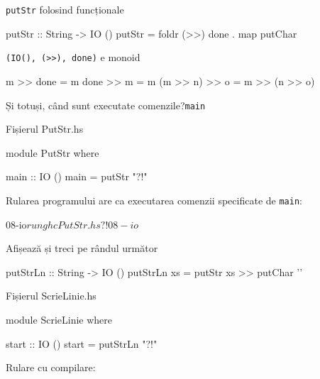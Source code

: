 \documentclass[xcolor=pdftex,romanian,colorlinks]{beamer}
\begin{document}
\begin{frame}[fragile]{\lstinline$putStr$ folosind funcționale}
\begin{asciihs}
   putStr     :: String -> IO ()
   putStr     = foldr (>>) done . map putChar
\end{asciihs}
\end{frame}

\begin{frame}[fragile]{\lstinline$(IO(), (>>), done)$ e monoid}
\begin{asciihs}
   m >> done           =   m
   done >> m           =   m
   (m >> n) >> o       =   m >> (n >> o)
\end{asciihs}
\end{frame}

\begin{frame}[fragile]{Și totuși, când sunt executate comenzile?}{\lstinline$main$}

\begin{block}
{Fișierul PutStr.hs}
\begin{asciihs}
   module PutStr where
   
   main :: IO ()
   main = putStr "?!"
\end{asciihs}
\end{block}

Rularea programului are ca  executarea comenzii specificate de \lstinline$main$:
\begin{asciihs}
   08-io$ runghc PutStr.hs
   ?!08-io$
\end{asciihs}
\end{frame}

%
%
%
\begin{frame}[fragile]{Afișează și treci pe rândul următor}
\begin{asciihs}
   putStrLn :: String -> IO ()
   putStrLn xs = putStr xs >> putChar '\n'
\end{asciihs}

\begin{block}
{Fișierul ScrieLinie.hs}
\begin{asciihs}
   module ScrieLinie where
   
   start :: IO ()
   start = putStrLn "?!"
\end{asciihs}
\end{block}


Rulare cu compilare:

\end{frame}
\end{document}
